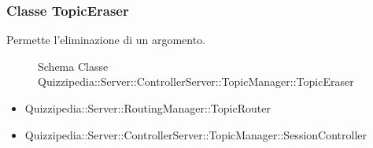 \subsubsection{Classe TopicEraser}
Permette l'eliminazione di un argomento.
\begin{figure}[H]
\centering
\noindent{}
\caption{Schema Classe Quizzipedia::Server::ControllerServer::TopicManager::TopicEraser}
\end{figure}
\begin{itemize}
\item Quizzipedia::Server::RoutingManager::TopicRouter
\end{itemize}
\begin{itemize}
\item Quizzipedia::Server::ControllerServer::TopicManager::SessionController
\end{itemize}
